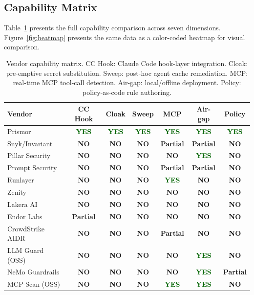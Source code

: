 \documentclass[11pt,letterpaper]{article}
\newcommand{\yes}{\textcolor{darkgreen}{\textbf{YES}}}
\newcommand{\no}{\textcolor{prismorred}{\textbf{NO}}}
\newcommand{\prt}{\textcolor{warnyellow}{\textbf{Partial}}}
\begin{document}
\subsection{Capability Matrix}

Table~\ref{tab:capability_matrix} presents the full capability comparison across seven
dimensions. Figure~\ref{fig:heatmap} presents the same data as a color-coded heatmap
for visual comparison.

\begin{table}[ht]
\centering
\small
\caption{Vendor capability matrix. CC Hook: Claude Code hook-layer integration.
         Cloak: pre-emptive secret substitution. Sweep: post-hoc agent cache remediation.
         MCP: real-time MCP tool-call detection. Air-gap: local/offline deployment.
         Policy: policy-as-code rule authoring.}
\label{tab:capability_matrix}
\begin{tabular}{@{}lcccccc@{}}
\toprule
\textbf{Vendor} & \textbf{CC Hook} & \textbf{Cloak} & \textbf{Sweep} & \textbf{MCP} & \textbf{Air-gap} & \textbf{Policy} \\
\midrule
Prismor         & \yes    & \yes   & \yes   & \yes & \yes    & \yes   \\
Snyk/Invariant  & \no     & \no    & \no    & \prt & \prt    & \no    \\
Pillar Security & \no     & \no    & \no    & \no  & \yes    & \no    \\
Prompt Security & \no     & \no    & \no    & \prt & \prt    & \no    \\
Runlayer        & \no     & \no    & \no    & \yes & \no     & \no    \\
Zenity          & \no     & \no    & \no    & \no  & \no     & \no    \\
Lakera AI       & \no     & \no    & \no    & \no  & \no     & \no    \\
Endor Labs      & \prt    & \no    & \no    & \no  & \no     & \no    \\
CrowdStrike AIDR & \no    & \no    & \no    & \prt & \no     & \no    \\
LLM Guard (OSS) & \no    & \no    & \no    & \no  & \yes    & \no    \\
NeMo Guardrails & \no    & \no    & \no    & \no  & \yes    & \prt   \\
MCP-Scan (OSS)  & \no    & \no    & \no    & \yes & \yes    & \no    \\
\bottomrule
\end{tabular}
\end{table}
\end{document}
